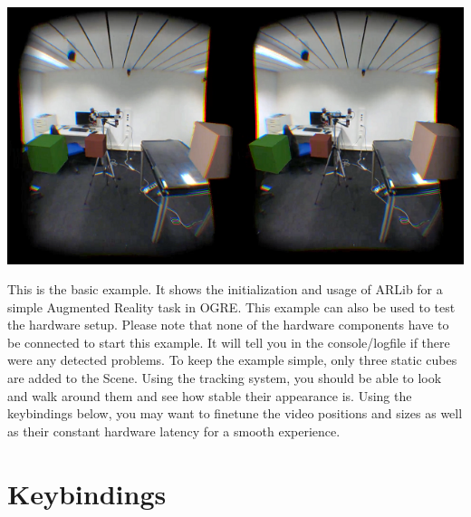 \includegraphics*[width=\textwidth]{SimpleSceneThumb.png}

This is the basic example. It shows the initialization and usage of ARLib for a simple Augmented Reality task in OGRE. This example can also be used to test the hardware setup. Please note that none of the hardware components have to be connected to start this example. It will tell you in the console/logfile if there were any detected problems. To keep the example simple, only three static cubes are added to the Scene. Using the tracking system, you should be able to look and walk around them and see how stable their appearance is. Using the keybindings below, you may want to finetune the video positions and sizes as well as their constant hardware latency for a smooth experience.

\section{Keybindings}\label{keybindings-1}


